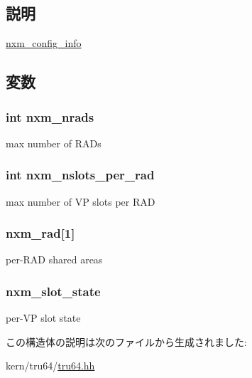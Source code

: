 \subsection{説明}
\hyperlink{structTru64_1_1nxm__config__info}{nxm\_\-config\_\-info} 

\subsection{変数}
\hypertarget{structTru64_1_1nxm__config__info_a4e9fc0098f3b715006c6e06626842884}{
\subsubsection[{nxm\_\-nrads}]{\setlength{\rightskip}{0pt plus 5cm}int {\bf nxm\_\-nrads}}}
\label{structTru64_1_1nxm__config__info_a4e9fc0098f3b715006c6e06626842884}


max number of RADs \hypertarget{structTru64_1_1nxm__config__info_ae850243d0c164134126c812301a40cb4}{
\subsubsection[{nxm\_\-nslots\_\-per\_\-rad}]{\setlength{\rightskip}{0pt plus 5cm}int {\bf nxm\_\-nslots\_\-per\_\-rad}}}
\label{structTru64_1_1nxm__config__info_ae850243d0c164134126c812301a40cb4}


max number of VP slots per RAD \hypertarget{structTru64_1_1nxm__config__info_a6f50aa5521412896eb5f261175c5dd7b}{
\subsubsection[{nxm\_\-rad}]{ {\bf nxm\_\-rad}\mbox{[}1\mbox{]}}}
\label{structTru64_1_1nxm__config__info_a6f50aa5521412896eb5f261175c5dd7b}


per-\/RAD shared areas \hypertarget{structTru64_1_1nxm__config__info_a5af50da8cac8bb510a64e9e314ac797a}{
\subsubsection[{nxm\_\-slot\_\-state}]{ {\bf nxm\_\-slot\_\-state}}}
\label{structTru64_1_1nxm__config__info_a5af50da8cac8bb510a64e9e314ac797a}


per-\/VP slot state 

この構造体の説明は次のファイルから生成されました:\begin{DoxyCompactItemize}
\item 
kern/tru64/\hyperlink{kern_2tru64_2tru64_8hh}{tru64.hh}\end{DoxyCompactItemize}
